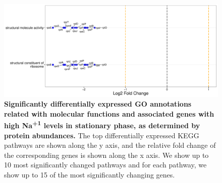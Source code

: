 \documentclass[a4paper]{article}
\begin{document}
\clearpage
\begin{figure}
	\includegraphics[width=1.0\textwidth]{../../d_figures/mf_n_05.pdf}
	\caption[Significantly altered GO annotations associated with molecular functions for protein samples in stationary phase tested for high Na\textsuperscript{+1} against base Na\textsuperscript{+1}]
	{\textbf{Significantly differentially expressed GO annotations related with molecular functions and associated genes with high Na\textsuperscript{+1} levels in stationary phase, as determined by protein abundances.} The top differentially expressed KEGG pathways are shown along the y axis, and the relative fold change of the corresponding genes is shown along the x axis. We show up to 10 most significantly changed pathways and for each pathway, we show up to 15 of the most significantly changing genes.}
\end{figure}

\end{document}
